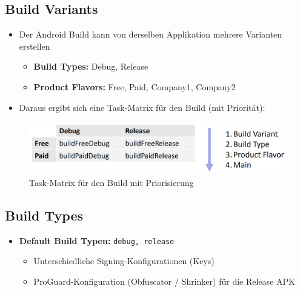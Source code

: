 \documentclass[a4paper]{article}
\begin{document}
{\begin{itemize}
	\end{itemize}

	\subsection{Build Variants}
	
	\begin{itemize}
		
		\item Der Android Build kann von derselben Applikation mehrere Varianten erstellen
		\begin{itemize}
			
			\item \textbf{Build Types:} Debug, Release
			\item \textbf{Product Flavors:} Free, Paid, Company1, Company2 
			
		\end{itemize}
		
		\item Daraus ergibt sich eine Task-Matrix für den Build (mit Priorität):
		
	\end{itemize}

	\begin{figure}[!htb]
		\centering
		\includegraphics[width=.6\textwidth]{img/flashtalk1/taskmatrix.png}
		\caption{Task-Matrix für den Build mit Priorisierung}
		\label{fig:taskmatrix_build}
	\end{figure}
	
	\subsection{Build Types}
	
	\begin{itemize}
		
		\item \textbf{Default Build Typen:} \texttt{debug, release}
		
		\begin{itemize}
			
			\item Unterschiedliche Signing-Konfigurationen (Keys)
			
			\item ProGuard-Konfiguration (Obfuscator / Shrinker) für die Release APK
			

\end{itemize}
\end{itemize}}
\end{document}
